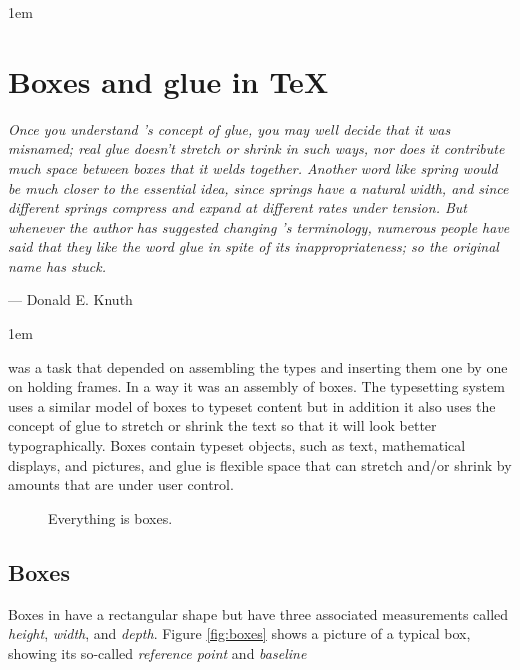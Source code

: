\parindent1em

\chapter{Boxes and glue in TeX}

\setlength{\columnsep}{2em}
{\it Once you understand \tex\rq{}s concept of glue, you may well decide that
it was misnamed; real glue doesn't stretch or shrink in such ways, nor does it
contribute much space between boxes that it welds together. Another word like
\emph{spring} would be much closer to the essential idea, since springs have a natural
width, and since different springs compress and expand at different rates
under tension. But whenever the author has suggested changing \tex's terminology,
numerous people have said that they like the word \emph{glue} in spite of its
inappropriateness; so the original name has stuck. }
\smallskip

{\hfill  ---  Donald E. Knuth}

\medskip   


\parindent1em




 was a task that depended on assembling the types and inserting them one by one on holding frames. In a way it was an assembly of boxes.
The \tex typesetting system uses a similar model of boxes to typeset content but in addition it also uses the concept of glue to stretch or shrink the text so that it will look better typographically. Boxes contain
typeset objects, such as text, mathematical displays, and pictures, and glue
is flexible space that can stretch and/or shrink by amounts that are under
user control.

\begin{figure}[h]
\hbox{}
\caption{Everything is boxes.}
\end{figure}

\begin{center}
\printfontparams
\end{center}

\section*{Boxes}

Boxes in \tex have  a rectangular shape but have
three associated measurements called \emph{height}, \emph{width}, and \emph{depth}.
Figure \ref{fig:boxes} shows a 
picture of a typical box, showing its so-called \emph{reference point} and \emph{baseline}

